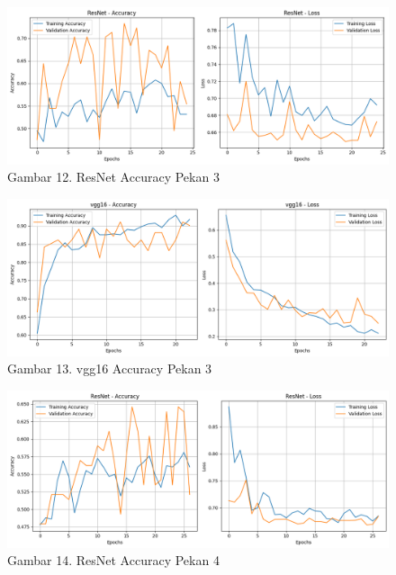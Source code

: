 \documentclass[12pt,a4paper]{article}
\begin{document}
\begin{adjustwidth}{3em}{0pt}
\begin{figure}[H]
    \centering
    \includegraphics[width=1\linewidth]{Images/akurasipekan3resnet.png}
    \caption*{Gambar 12.  ResNet Accuracy Pekan 3}
    \label{fig:dataset_collection}
\end{figure}

\begin{figure}[H]
    \centering
    \includegraphics[width=1\linewidth]{Images/akurasipekan3vgg.png}
    \caption*{Gambar 13.  vgg16 Accuracy Pekan 3}
    \label{fig:dataset_collection}
\end{figure}

\begin{figure}[H]
    \centering
    \includegraphics[width=1\linewidth]{Images/akurasipekan4resnet.png}
    \caption*{Gambar 14.  ResNet Accuracy Pekan 4}
    \label{fig:dataset_collection}
\end{figure}


\end{adjustwidth}
\end{document}
